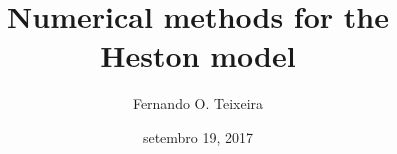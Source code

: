 \documentclass[12pt,twoside]{reedthesis}
\title{\textbf{\Huge{Numerical methods for the \\[20pt] Heston model}}}
\author{Fernando O. Teixeira}
\date{setembro 19, 2017}
\theoremstyle{definition}
\theoremstyle{definition}
\theoremstyle{remark}
\begin{document}
      \maketitle
  
  \frontmatter %
  \pagestyle{empty} %
      \begin{acknowledgements}
      \textbf{\\ \\ \\ \\ \\ \\ \\ \\ \\ \\ \\ \\ \\ \\ \\ \\ \\ \\ \\ \\ \\ \\ \\ \\ \\ \\ \\ \\ \\ \\ \\ \\ \\ \\ \\ \\ \\ \\ \\ \\ \\ \\ \\ \\ \\ \\ \\ \\ \\ \\ \\ \\ \\ \\ \\ \\ \\ \\ \\ \\ \\ \\ \\ }

\end{acknowledgements}
\end{document}
